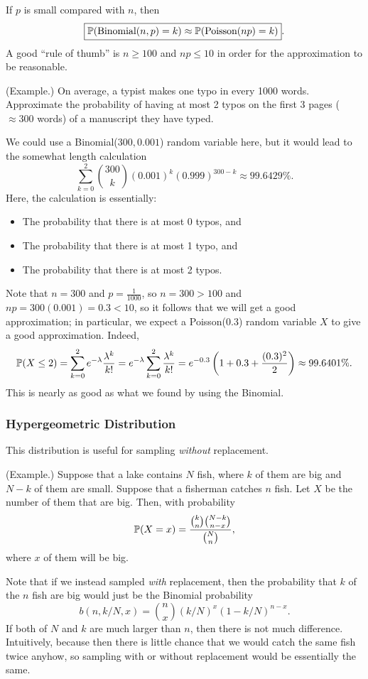 \bigskip 

If $p$ is small compared with $n$, then 
\[\boxed{\mathbb{P}(\text{Binomial}(n, p) = k) \approx \mathbb{P}(\text{Poisson}(np) = k)}.\]
A good ``rule of thumb'' is $n \geq 100$ and $np \leq 10$ in order for the approximation to be reasonable. 

\begin{mdframed}[]
    (Example.) On average, a typist makes one typo in every 1000 words. Approximate the probability of having at most 2 typos on the first 3 pages ($\approx 300$ words) of a manuscript they have typed. 

    \begin{mdframed}[]
        We could use a Binomial($300, 0.001$) random variable here, but it would lead to the somewhat length calculation 
        \[\sum_{k = 0}^2 \binom{300}{k} (0.001)^k (0.999)^{300 - k} \approx 99.6429\%.\]
        Here, the calculation is essentially: 
        \begin{itemize}
            \item The probability that there is at most 0 typos, and
            \item The probability that there is at most 1 typo, and
            \item The probability that there is at most 2 typos. 
        \end{itemize}
        Note that $n = 300$ and $p = \frac{1}{1000}$, so $n = 300 > 100$ and $np = 300(0.001) = 0.3 < 10$, so it follows that we will get a good approximation; in particular, we expect a Poisson($0.3$) random variable $X$ to give a good approximation. Indeed, 
        \[\mathbb{P}(X \leq 2) = \sum_{k = 0}^2 e^{-\lambda} \frac{\lambda^k}{k!} = e^{-\lambda} \sum_{k = 0}^2 \frac{\lambda^k}{k!} = e^{-0.3}\left(1 + 0.3 + \frac{(0.3)^2}{2}\right) \approx 99.6401\%.\]
        This is nearly as good as what we found by using the Binomial. 
    \end{mdframed}
\end{mdframed}

\subsubsection{Hypergeometric Distribution}
This distribution is useful for sampling \emph{without} replacement. 

\begin{mdframed}[]
    (Example.) Suppose that a lake contains $N$ fish, where $k$ of them are big and $N - k$ of them are small. Suppose that a fisherman catches $n$ fish. Let $X$ be the number of them that are big. Then, with probability 
    \[\mathbb{P}(X = x) = \frac{\binom{k}{n} \binom{N - k}{n - x}}{\binom{N}{n}},\]
    where $x$ of them will be big. 
\end{mdframed}
Note that if we instead sampled \emph{with} replacement, then the probability that $k$ of the $n$ fish are big would just be the Binomial probability 
\[b(n, k / N, x) = \binom{n}{x} (k/N)^x (1 - k/N)^{n - x}.\]
If both of $N$ and $k$ are much larger than $n$, then there is not much difference. Intuitively, because then there is little chance that we would catch the same fish twice anyhow, so sampling with or without replacement would be essentially the same. 

